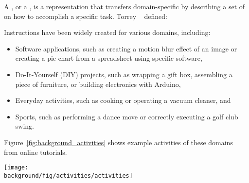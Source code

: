 A , or a , is a representation that transfers domain-specific  by describing a set of  on how to accomplish a specific task. Torrey \ea{}~\cite{Torrey:2007he} defined:
\begin{quote}
\end{quote}
%
%
Instructions have been widely created for various domains, including:

\begin{itemize}
  \item Software applications, such as creating a motion blur effect of an image or creating a pie chart from a spreadsheet using specific software,
  \item Do-It-Yourself (DIY) projects, such as wrapping a gift box, assembling a piece of furniture, or building electronics with Arduino,
  \item Everyday activities, such as cooking or operating a vacuum cleaner, and
  \item Sports, such as performing a dance move or correctly executing a golf club swing.
\end{itemize}

Figure~\ref{fig:background_activities} shows example activities of these domains from online tutorials.
\\

\begin{figure*}[b!]
  \centering
  \begin{minipage}{\textwidth}
  \texttt{[image: \\background/fig/activities/activities]}
  \caption[Example activities in tutorial domains.]{Example activities in tutorial domains:
  a) image manipulations using a software application\footnote{``Photoshop Playbook: Selective Focus'', \url{https://youtu.be/Wh3ahxqDnyw} \copyright2016 with express permission from Adobe Systems Incorporated.},
  b) gift wrapping, a DIY task\footnote{``How to do a Japanese Gift Wrap'' by Rouge Shop, \url{https://youtu.be/Mf3IyeMF8ug}, licensed under CC BY 2.0},
  c) cooking, an everyday activity\footnote{``How to Cook a Turkey in a Convection Oven'' by Six Sisters' Stuff, \url{https://youtu.be/QNkwKj1Vsuc}, licensed under CC BY 2.0}, and
  d) golf lessons in sports\footnote{``Pat's Golf Tips Top of Swing Position'' by Blue Rock Golf Academy, \url{https://youtu.be/H06o7fMQSi4}, licensed under CC BY 2.0}.
  }
  \label{fig:background_activities}
  \end{minipage}
\end{figure*}

